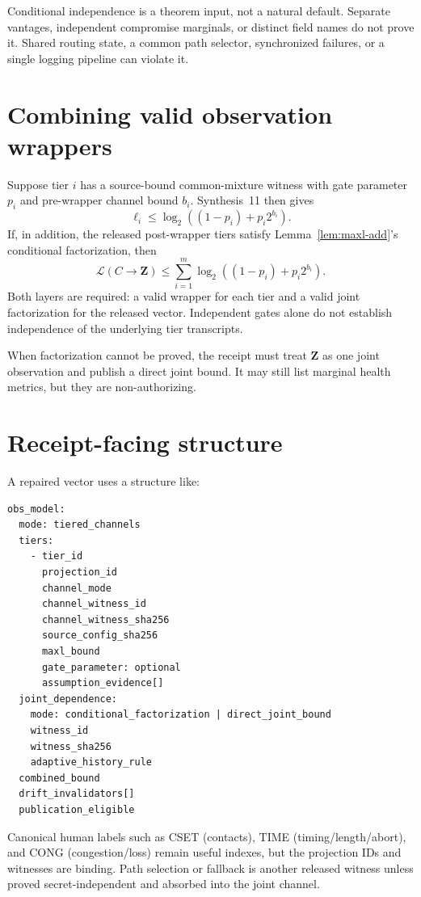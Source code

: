 \documentclass[11pt]{article}
\theoremstyle{definition}
\newcommand{\MaxL}{\mathcal{L}}
\begin{document}
Conditional independence is a theorem input, not a natural default. Separate vantages, independent compromise marginals, or distinct field names do not prove it. Shared routing state, a common path selector, synchronized failures, or a single logging pipeline can violate it.

\section{Combining valid observation wrappers}\label{sec:wrappers}
Suppose tier \(i\) has a source-bound common-mixture witness with gate parameter \(p_i\) and pre-wrapper channel bound \(b_i\). Synthesis~11 then gives
\[
\ell_i\le\log_2\!\left((1-p_i)+p_i2^{b_i}\right).
\]
If, in addition, the released post-wrapper tiers satisfy Lemma~\ref{lem:maxl-add}'s conditional factorization, then
\[
\MaxL(C\to\mathbf Z)
\le\sum_{i=1}^m\log_2\!\left((1-p_i)+p_i2^{b_i}\right).
\]
Both layers are required: a valid wrapper for each tier and a valid joint factorization for the released vector. Independent gates alone do not establish independence of the underlying tier transcripts.

When factorization cannot be proved, the receipt must treat \(\mathbf Z\) as one joint observation and publish a direct joint bound. It may still list marginal health metrics, but they are non-authorizing.

\section{Receipt-facing structure}\label{sec:receipt}
A repaired vector uses a structure like:
\begin{verbatim}
obs_model:
  mode: tiered_channels
  tiers:
    - tier_id
      projection_id
      channel_mode
      channel_witness_id
      channel_witness_sha256
      source_config_sha256
      maxl_bound
      gate_parameter: optional
      assumption_evidence[]
  joint_dependence:
    mode: conditional_factorization | direct_joint_bound
    witness_id
    witness_sha256
    adaptive_history_rule
  combined_bound
  drift_invalidators[]
  publication_eligible
\end{verbatim}

Canonical human labels such as CSET (contacts), TIME (timing/length/abort), and CONG (congestion/loss) remain useful indexes, but the projection IDs and witnesses are binding. Path selection or fallback is another released witness unless proved secret-independent and absorbed into the joint channel.\cite{series:tieredpattern,series:fallbacktax}
\end{document}
